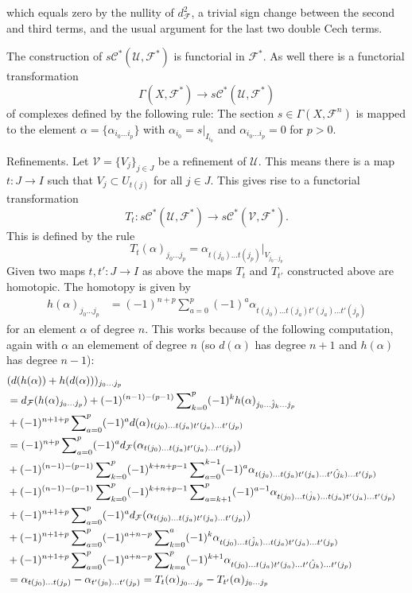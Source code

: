 which equals zero by the nullity of $d_{\mathcal F}^2$, 
a trivial sign change between the second and third terms, and
the usual argument for the last two double Cech terms.

\medskip\noindent
The construction of $s{\mathcal C}^*({\mathcal U}, {\mathcal F}^*)$
is functorial in ${\mathcal F}^*$. As well there is a functorial
transformation
$$
\Gamma(X, {\mathcal F}^*)
\longrightarrow
s{\mathcal C}^*({\mathcal U}, {\mathcal F}^*)
$$
of complexes defined by the following rule: The section
$s\in \Gamma(X,{\mathcal F}^n)$
is mapped to the element $\alpha=\{\alpha_{i_0\ldots i_p}\}$
with $\alpha_{i_0} = s|_{I_{i_0}}$ and $\alpha_{i_0\ldots i_p}=0$
for $p>0$.

\medskip\noindent
Refinements. Let ${\mathcal V} = \{ V_j \}_{j\in J}$ be a
refinement of ${\mathcal U}$. This means there is a map $t: J \to I$
such that $V_j \subset U_{t(j)}$ for all $j\in J$. This gives
rise to a functorial transformation
$$
T_t : s{\mathcal C}^*({\mathcal U}, {\mathcal F}^*)
\longrightarrow
s{\mathcal C}^*({\mathcal V}, {\mathcal F}^*).
$$
This is defined by the rule
$$
T_t(\alpha)_{j_0\ldots j_p}
= 
\alpha_{t(j_0)\ldots t(j_p)}|_{V_{j_0\ldots j_p}}
$$
Given two maps $t,t' : J \to I$ as above the maps
$T_t$ and $T_{t'}$ constructed above are homotopic.
The homotopy is given by
\begin{align}
h(\alpha)_{j_0\ldots j_p}
& =
(-1)^{n+p}
\sum\nolimits_{a=0}^{p}
(-1)^a
\alpha_{t(j_0)\ldots t(j_a) t'(j_a) \ldots t'(j_p)}
\end{align}
for an element $\alpha$ of degree $n$. This works
because of the following computation, again with
$\alpha$ an elemement of degree $n$ (so $d(\alpha)$
has degree $n+1$ and $h(\alpha)$ has degree $n-1$):
\begin{align}
& (
d(h(\alpha)) + h(d(\alpha))
)_{j_0\ldots j_p}
\cr
& = 
d_{\mathcal F}(h(\alpha)_{j_0\ldots j_p})
+
(-1)^{(n-1)-(p-1)}
\sum\nolimits_{k=0}^p
(-1)^k
h(\alpha)_{j_0\ldots\hat j_k\ldots j_p}
\cr
& +
(-1)^{n+1+p}
\sum\nolimits_{a=0}^p
(-1)^a
d(\alpha)_{t(j_0)\ldots t(j_a) t'(j_a) \ldots t'(j_p)}
\cr
& =
(-1)^{n+p}
\sum\nolimits_{a=0}^p
(-1)^a
d_{\mathcal F}(\alpha_{t(j_0)\ldots t(j_a) t'(j_a) \ldots t'(j_p)})
\cr
& +
(-1)^{(n-1)-(p-1)}
\sum\nolimits_{k=0}^p
(-1)^{k+n+p-1}
\sum\nolimits_{a=0}^{k-1}
(-1)^a
\alpha_{t(j_0)\ldots t(j_a)t'(j_a)\ldots\hat{t'(j_k)}\ldots t'(j_p)}
\cr
& +
(-1)^{(n-1)-(p-1)}
\sum\nolimits_{k=0}^p
(-1)^{k+n+p-1}
\sum\nolimits_{a=k+1}^p
(-1)^{a-1}
\alpha_{t(j_0)\ldots\hat{t(j_k)}\ldots t(j_a)t'(j_a)\ldots t'(j_p)}
\cr
& +
(-1)^{n+1+p}
\sum\nolimits_{a=0}^p
(-1)^a
d_{\mathcal F}(\alpha_{t(j_0)\ldots t(j_a) t'(j_a) \ldots t'(j_p)})
\cr
& +
(-1)^{n+1+p}
\sum\nolimits_{a=0}^p
(-1)^{a+n-p}
\sum\nolimits_{k=0}^a
(-1)^k
\alpha_{t(j_0)\ldots \hat{t(j_k)}\ldots t(j_a)t'(j_a)\ldots t'(j_p)}
\cr
& +
(-1)^{n+1+p}
\sum\nolimits_{a=0}^p
(-1)^{a+n-p}
\sum\nolimits_{k=a}^p
(-1)^{k+1}
\alpha_{t(j_0)\ldots t(j_a)t'(j_a)\ldots \hat{t'(j_k)}\ldots t'(j_p)}
\cr
& = 
\alpha_{t(j_0)\ldots t(j_p)} - \alpha_{t'(j_0)\ldots t'(j_p)}
=
T_t(\alpha)_{j_0\ldots j_p} - T_{t'}(\alpha)_{j_0\ldots j_p}
\end{align}
